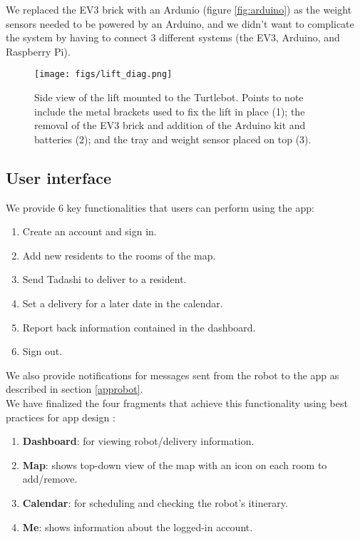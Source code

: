 \documentclass{article}
\begin{document}
We replaced the EV3 brick with an Ardunio (figure \ref{fig:arduino}) as the weight sensors needed to be powered by an Arduino, and we didn't want to complicate the system by having to connect 3 different systems (the EV3, Arduino, and Raspberry Pi).


\begin{figure}
  \begin{center}
    \texttt{[image: figs/lift\_diag.png]}
    \caption{Side view of the lift mounted to the Turtlebot. Points to note include the metal brackets used to fix the lift in place (1); the removal of the EV3 brick and addition of the Arduino kit and batteries (2); and the tray and weight sensor placed on top (3).}
  \label{fig:lift}
  \end{center}
\end{figure}

\subsection{User interface}
\label{ui}
We provide 6 key functionalities that users can perform using the app:
\begin{enumerate}
\item Create an account and sign in. 
\item Add new residents to the rooms of the map.
\item Send Tadashi to deliver to a resident. 
\item Set a delivery for a later date in the calendar. 
\item Report back information contained in the dashboard.
\item Sign out.
\end{enumerate}
We also provide notifications for messages sent from the robot to the app as described in section \ref{approbot}.
\\
We have finalized the four fragments that achieve this functionality using best practices for app design \cite{design, ux}:
\begin{enumerate}
  \item {\bf Dashboard}: for viewing robot/delivery information.
  \item {\bf Map}: shows top-down view of the map with an icon on each room to add/remove. 
  \item {\bf Calendar}: for scheduling and checking the robot's itinerary.
  \item {\bf Me}: shows information about the logged-in account.
\end{enumerate}
\end{document}
